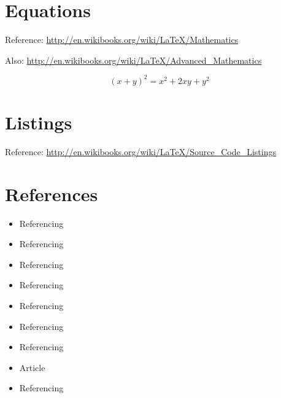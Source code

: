 \documentclass{projetofinal-dcc}
\begin{document}
\section{Equations}\label{sec:LABEL_CHP_2_SEC_C}
Reference: \url{http://en.wikibooks.org/wiki/LaTeX/Mathematics}

Also: \url{http://en.wikibooks.org/wiki/LaTeX/Advanced\_Mathematics}

\begin{equation}
  (x + y)^2 = x^2 + 2xy + y^2
  \label{eq:LABEL_EQ_1}
\end{equation}

\section{Listings}\label{sec:LABEL_CHP_2_SEC_D}
Reference: \url{http://en.wikibooks.org/wiki/LaTeX/Source_Code_Listings}



\section{References}\label{sec:LABEL_CHP_2_SEC_E}
\begin{itemize}
  \item Referencing 
  \item Referencing 
  \item Referencing 
  \item Referencing 
  \item Referencing 
  \item Referencing 
  \item Referencing 
  \item Article \cite{art:REF_ART_1}
  \item Referencing 
\end{itemize}

\pagebreak



\end{document}
